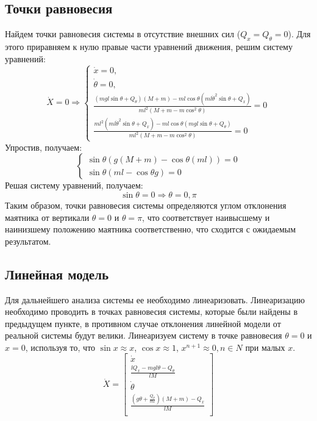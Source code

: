 \subsection{Точки равновесия}
Найдем точки равновесия системы в отсутствие внешних сил ($Q_x = Q_{\theta} = 0$). 
Для этого приравняем к нулю правые части уравнений движения, решим систему уравнений:
\begin{equation}
    \dot{X} = 0 \Rightarrow 
    \begin{cases}
        \dot{x} = 0, \\
        \dot{\theta} = 0, \\
        \frac{(mgl\sin\theta + Q_{\theta})(M + m) - ml\cos\theta(ml\dot{\theta}^2\sin\theta + Q_x)}{ml^2(M + m - m\cos^2\theta)} = 0 \\ 
        \frac{ml^2(ml\dot{\theta}^2\sin\theta + Q_x) - ml\cos\theta(mgl\sin\theta + Q_{\theta})}{ml^2(M + m - m\cos^2\theta)} = 0
    \end{cases}
\end{equation}
Упростив, получаем: 
\begin{equation}
    \begin{cases}
        \sin\theta(g(M + m) - \cos\theta(ml)) = 0 \\ 
        \sin\theta(ml - \cos\theta g) = 0
    \end{cases}
\end{equation}
Решая систему уравнений, получаем:
\begin{equation}
    \sin\theta = 0 \Rightarrow \theta = 0, \pi 
\end{equation}
Таким образом, точки равновесия системы определяются углом отклонения маятника от вертикали $\theta = 0$ и $\theta = \pi$, 
что соответствует наивысшему и наинизшему положению маятника соответственно, что сходится с ожидаемым результатом. 

\subsection{Линейная модель}
Для дальнейшего анализа системы ее необходимо линеаризовать. Линеаризацию необходимо проводить в точках равновесия 
системы, которые были найдены в предыдущем пункте, в противном случае отклонения линейной модели от реальной системы будут велики. 
Линеаризуем систему в точке равновесия $\theta = 0$ и $x = 0$, используя то, что $\sin x \approx x$, $\cos x \approx 1$, $x^{n + 1} \approx 0, n \in N$ 
при малых $x$. 
\begin{equation}
    \dot{X} = \begin{bmatrix}
        \dot{x} \\
        \frac{lQ_x - mgl\theta - Q_{\theta}}{lM} \\
        \dot{\theta} \\
        \frac{(g\theta + \frac{Q_{\theta}}{ml})(M + m) -Q_x}{lM} \\ 
    \end{bmatrix}
\end{equation}

